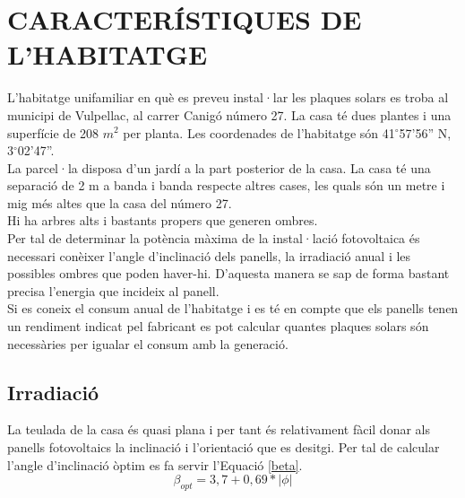 \chapter{\uppercase{Característiques de l'habitatge}}
L'habitatge unifamiliar en què es preveu instal·lar les plaques solars es troba al municipi de Vulpellac, al carrer Canigó número 27. La casa té dues plantes i una superfície de 208 $m^2$ per planta. Les coordenades de l'habitatge són 41$^\circ$57'56'' N, 3$^\circ$02'47''. \\
\newline La parcel·la disposa d'un jardí a la part posterior de la casa. La casa té una separació de 2 m a banda i banda respecte altres cases, les quals són un metre i mig més altes que la casa del número 27.\\
\newline Hi ha arbres alts i bastants propers que generen ombres.\\
\newline Per tal de determinar la potència màxima de la instal·lació fotovoltaica és necessari conèixer l'angle d'inclinació dels panells, la irradiació anual i les possibles ombres que poden haver-hi. D'aquesta manera se sap de forma bastant precisa l'energia que incideix al panell.\\
\newline Si es coneix el consum anual de l'habitatge i es té en compte que els panells tenen un rendiment indicat pel fabricant es pot calcular quantes plaques solars són necessàries per igualar el consum amb la generació.\\

\section{Irradiació}

La teulada de la casa és quasi plana i per tant és relativament fàcil donar als panells fotovoltaics la inclinació i l'orientació que es desitgi. Per tal de calcular l'angle d'inclinació òptim es fa servir l'Equació \ref{beta}.
\begin{equation} \label{beta}
\beta_{opt}=3,7 + 0,69*|\phi|
\end{equation}

